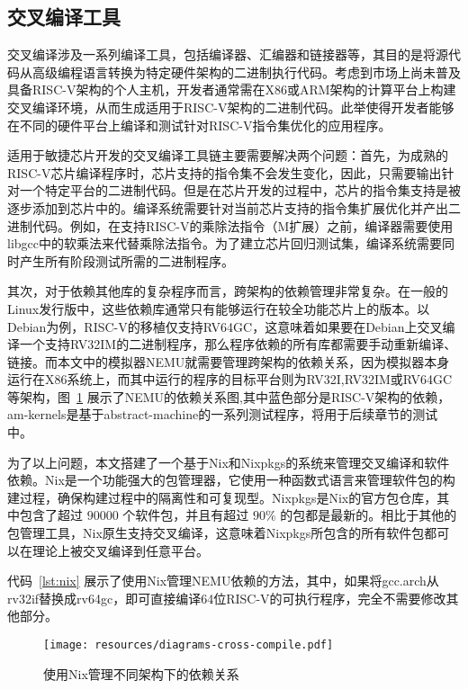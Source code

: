 \subsection{交叉编译工具}


交叉编译涉及一系列编译工具，包括编译器、汇编器和链接器等，其目的是将源代码从高级编程语言转换为特定硬件架构的二进制执行代码。考虑到市场上尚未普及具备RISC-V架构的个人主机，开发者通常需在X86或ARM架构的计算平台上构建交叉编译环境，从而生成适用于RISC-V架构的二进制代码。此举使得开发者能够在不同的硬件平台上编译和测试针对RISC-V指令集优化的应用程序。

适用于敏捷芯片开发的交叉编译工具链主要需要解决两个问题：首先，为成熟的RISC-V芯片编译程序时，芯片支持的指令集不会发生变化，因此，只需要输出针对一个特定平台的二进制代码。但是在芯片开发的过程中，芯片的指令集支持是被逐步添加到芯片中的。编译系统需要针对当前芯片支持的指令集扩展优化并产出二进制代码。例如，在支持RISC-V的乘除法指令（M扩展）之前，编译器需要使用libgcc中的软乘法来代替乘除法指令。为了建立芯片回归测试集，编译系统需要同时产生所有阶段测试所需的二进制程序。

其次，对于依赖其他库的复杂程序而言，跨架构的依赖管理非常复杂。在一般的Linux发行版中，这些依赖库通常只有能够运行在较全功能芯片上的版本。以Debian为例，RISC-V的移植仅支持RV64GC，这意味着如果要在Debian上交叉编译一个支持RV32IM的二进制程序，那么程序依赖的所有库都需要手动重新编译、链接。而本文中的模拟器NEMU就需要管理跨架构的依赖关系，因为模拟器本身运行在X86系统上，而其中运行的程序的目标平台则为RV32I,RV32IM或RV64GC等架构，图~\ref{fig:cross-compile} 展示了NEMU的依赖关系图,其中蓝色部分是RISC-V架构的依赖，am-kernels是基于abstract-machine的一系列测试程序，将用于后续章节的测试中。

为了以上问题，本文搭建了一个基于Nix和Nixpkgs的系统来管理交叉编译和软件依赖。Nix是一个功能强大的包管理器，它使用一种函数式语言来管理软件包的构建过程，确保构建过程中的隔离性和可复现型。Nixpkgs是Nix的官方包仓库，其中包含了超过 $90000$ 个软件包，并且有超过 $90\%$ 的包都是最新的。相比于其他的包管理工具，Nix原生支持交叉编译，这意味着Nixpkgs所包含的所有软件包都可以在理论上被交叉编译到任意平台。

代码~\ref{lst:nix} 展示了使用Nix管理NEMU依赖的方法，其中，如果将gcc.arch从rv32if替换成rv64gc，即可直接编译64位RISC-V的可执行程序，完全不需要修改其他部分。

\begin{figure}
    \centering
    \texttt{[image: resources/diagrams-cross-compile.pdf]}
    \caption{使用Nix管理不同架构下的依赖关系}
    \label{fig:cross-compile}
\end{figure}


